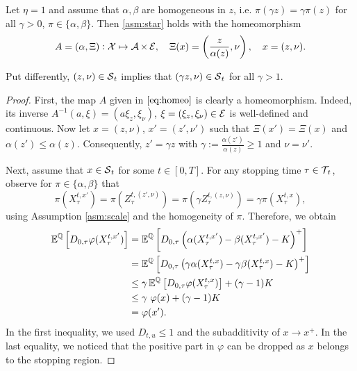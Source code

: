 \begin{proposition}
\label{prop:star}
Let $\eta =1$ and assume that $\alpha,\beta$ are homogeneous in $z$, i.e. $\pi(\gamma z)=\gamma \pi(z)$  for all $\gamma>0$,  $\pi \in \{\alpha,\beta\}$. Then \cref{asm:star} holds with the homeomorphism
\begin{equation}\label{eq:homeo}
A=(\alpha,\Xi): \operatorname{\mathcal{X}}  \mapsto \operatorname{\mathcal{A}} \times \operatorname{\mathcal{E}}, \quad 
\Xi(x) = \left(\frac{z}{\alpha(z)},\nu\right), \quad x = (z,\nu). 
\end{equation}

 Put differently,  $(z,\nu)\in \operatorname{\mathcal{S}}_t$ implies that $(\gamma z,\nu) \in \operatorname{\mathcal{S}}_t$ for all $\gamma > 1$.

\end{proposition} 
\begin{proof}
First, the map $A$ given in $\eqref{eq:homeo}$ is clearly a homeomorphism. Indeed, its inverse $A^{-1}(a,\xi) = (a \xi_z,\xi_\nu)$, $\xi = (\xi_z,\xi_\nu) \in \operatorname{\mathcal{E}}$ is well-defined and continuous. Now let  $x = (z,\nu)$, $x' =(z',\nu')$  such that $\Xi(x')=\Xi(x)$ and $\alpha(z') \le \alpha(z)$. Consequently,   $z'= \gamma z$ with $\gamma := \frac{\alpha(z')}{\alpha(z)} \ge 1$ and $\nu = \nu'$. 

Next, assume that $x\in \operatorname{\mathcal{S}}_t$ for some $t\in [0,T]$. For any  stopping time $\tau \in \operatorname{\mathcal{T}}_{\!t}$, observe for $\pi \in \{\alpha,\beta\}$ that 
$$\pi(X^{t,x'}_{\tau})=\pi(Z^{t,(z',\nu)}_{\tau})=\pi(\gamma Z^{t,(z,\nu)}_{\tau})=\gamma \pi(X^{t,x}_{\tau}), $$ 
using Assumption \ref{asm:scale} and the homogeneity of $\pi$.
Therefore, we obtain
\begin{align*}
    \operatorname{\mathbb{E}}^{\operatorname{\mathbb{Q}}}\left[ D_{0,\tau} \varphi(X^{t,x'}_{\tau})\right] &= \operatorname{\mathbb{E}}^{\operatorname{\mathbb{Q}}}\left[ D_{0,\tau} \left(\alpha(X^{t,x'}_{\tau}) -\beta(X^{t,x'}_{\tau}) -K\right)^+ \right]\\
    &= \operatorname{\mathbb{E}}^{\operatorname{\mathbb{Q}}}\left[ D_{0,\tau} \left(\gamma \alpha(X^{t,x}_{\tau}) -\gamma \beta(X^{t,x}_{\tau}) -K\right)^+ \right]\\
   &\le \gamma \operatorname{\mathbb{E}}^{\operatorname{\mathbb{Q}}}\left[ D_{0,\tau} \varphi(X^{t,x}_{\tau}) \right] + (\gamma  - 1)K\\
   &\le \gamma \ \varphi(x) + (\gamma  - 1)K\\
   &= \varphi(x').
\end{align*}
In the first inequality, we used  $D_{t,u} \le 1$ and the subadditivity of $x \to x^+$. In the last equality, we noticed that the positive part  in $\varphi$ can be dropped as $x$ belongs to the  stopping region. 

\end{proof}

